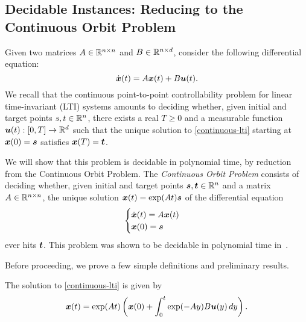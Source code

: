 \subsection{Decidable Instances: Reducing to the Continuous Orbit Problem}

\label{continuous-decidability}

Given two matrices $A \in \mathbb{R}^{n \times n}$ and $B \in \mathbb{R}^{n \times d}$, consider the following differential equation:
\begin{equation}
\label{continuous-lti}
\dot{\myvector{x}}(t) = A \myvector{x}(t) + B \myvector{u}(t) .
\end{equation}
We recall that the continuous point-to-point controllability problem for linear time-invariant (LTI) systems amounts to deciding whether, given initial and target points $s,t \in \mathbb{R}^{n}$, there exists a real $T\geq 0$ and a measurable function $\boldsymbol{u}(t) : [0,T] \rightarrow \mathbb{R}^{d}$ such that the unique solution to \cref{continuous-lti} starting at $\boldsymbol{x}(0) = \boldsymbol{s}$ satisfies $\boldsymbol{x}(T) = \boldsymbol{t}$.

We will show that this problem is decidable in polynomial time, by reduction from the Continuous Orbit Problem. The \emph{Continuous Orbit Problem} consists of deciding whether, given initial and target points $\boldsymbol{s}, \boldsymbol{t} \in \mathbb{R}^{n}$ and a matrix $A \in \mathbb{R}^{n \times n}$, the unique solution $\boldsymbol{x}(t) = \exp(A t) \boldsymbol{s}$ of the differential equation
\begin{equation}
\begin{cases}
\dot{\boldsymbol{x}}(t) = A \boldsymbol{x}(t) \\
\boldsymbol{x}(0) = \boldsymbol{s}
\end{cases}
\end{equation}
ever hits $\boldsymbol{t}$. This problem was shown to be decidable in polynomial time in~\cite{ContinuousSkolem1, ContinuousOrbitIPL}.

Before proceeding, we prove a few simple definitions and preliminary results.

\begin{lemma}
\label{closed-form-solution}
The solution to \cref{continuous-lti} is given by
\begin{equation*}
\boldsymbol{x}(t) = \exp(At) \left( \boldsymbol{x}(0) + \int_{0}^{t} \exp(-Ay) B \boldsymbol{u}(y) \, dy \right).
\end{equation*}
\end{lemma}

